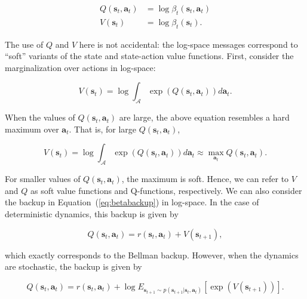 \begin{align*}
Q(\mathbf{s}_t,\mathbf{a}_t) &= \log \beta_t(\mathbf{s}_t,\mathbf{a}_t) \\
V(\mathbf{s}_t) &= \log \beta_t(\mathbf{s}_t).
\end{align*}

The use of $Q$ and $V$ here is not accidental: the log-space messages correspond to ``soft'' variants of the state and state-action value functions. First, consider the marginalization over actions in log-space:

\begin{equation*}
V(\mathbf{s}_t) = \log \int_\mathcal{A} \exp(Q(\mathbf{s}_t,\mathbf{a}_t)) d\mathbf{a}_t.
\end{equation*}

When the values of $Q(\mathbf{s}_t,\mathbf{a}_t)$ are large, the above equation resembles a hard maximum over $\mathbf{a}_t$. That is, for large $Q(\mathbf{s}_t,\mathbf{a}_t)$,

\begin{equation*}
V(\mathbf{s}_t) = \log \int_\mathcal{A} \exp(Q(\mathbf{s}_t,\mathbf{a}_t)) d\mathbf{a}_t \approx \max_{\mathbf{a}_t} Q(\mathbf{s}_t,\mathbf{a}_t).
\end{equation*}

For smaller values of $Q(\mathbf{s}_t,\mathbf{a}_t)$, the maximum is soft. Hence, we can refer to $V$ and $Q$ as soft value functions and Q-functions, respectively. We can also consider the backup in Equation~(\ref{eq:betabackup}) in log-space. In the case of deterministic dynamics, this backup is given by

\begin{equation*}
Q(\mathbf{s}_t,\mathbf{a}_t) = r(\mathbf{s}_t,\mathbf{a}_t) + V(\mathbf{s}_{t+1}),
\end{equation*}

which exactly corresponds to the Bellman backup. However, when the dynamics are stochastic, the backup is given by

\begin{equation}
Q(\mathbf{s}_t,\mathbf{a}_t) = r(\mathbf{s}_t,\mathbf{a}_t) + \log E_{\mathbf{s}_{t+1} \sim p(\mathbf{s}_{t+1}|\mathbf{s}_t,\mathbf{a}_t)} [\exp( V(\mathbf{s}_{t+1}))].\label{eq:optimisticbackup}
\end{equation}

